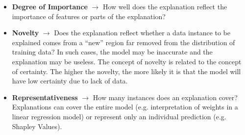 \begin{itemize}
    \item \textbf{Degree of Importance} $\rightarrow$ How well does the explanation reflect the importance of features or parts of the explanation?
    \item \textbf{Novelty} $\rightarrow$ Does the explanation reflect whether a data instance to be explained comes from a “new” region far removed from the distribution of training data? In such cases, the model may be inaccurate and the explanation may be useless. 
    The concept of novelty is related to the concept of certainty. The higher the novelty, the more likely it is that the model will have low certainty due to lack of data.
    \item \textbf{Representativeness} $\rightarrow$ How many instances does an explanation cover? Explanations can cover the entire model (e.g. interpretation of weights in a linear regression model) or represent only an individual prediction (e.g. Shapley Values).
\end{itemize}